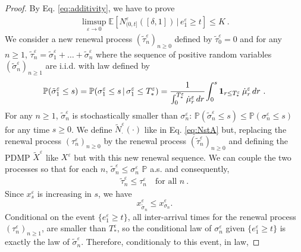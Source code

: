 \documentclass[reqno, 12pt, a4paper]{amsart}
\theoremstyle{plain}
\theoremstyle{definition}
\begin{document}
\begin{proof}
By Eq. \eqref{eq:additivity}, we have to prove 
\begin{equation}
\begin{split}
\limsup_{\varepsilon \to 0} \mathbb E \left[ N^\varepsilon_{(0,t]} ([\delta,1])  \, \vert \, e_1^\varepsilon \ge t \right] \le K \ .
\end{split}
\end{equation}
We consider a new renewal process $(\tilde\tau_n^\varepsilon)_{n \ge 0}$ defined by $\tilde\tau_0^\varepsilon=0$ and for any $n \ge 1$, $\tilde\tau_n^\varepsilon = \tilde\sigma_1^\varepsilon + \ldots+\tilde\sigma_n^\varepsilon$ where the sequence of positive random variables $(\tilde\sigma_n^\varepsilon)_{n \ge 1}$ are i.i.d. with law defined by 
\begin{equation}
\begin{split}
\mathbb P (\tilde\sigma^\varepsilon_1 \le s) = \mathbb P( \sigma_1^\varepsilon \le s  \, \vert \, \sigma_1^\varepsilon \le T_*^\varepsilon) = \cfrac{1}{\int_0^{T_*^\varepsilon}  \dot{\mu}_r^\varepsilon \, dr } \int_0^s {\bf 1}_{r \le T^\varepsilon_*}  \, \dot{\mu}_r^\varepsilon \, dr \ .
\end{split}
\end{equation}
For any $n \ge 1$, $\tilde\sigma_n^\varepsilon$ is stochastically smaller than $\sigma_n^\varepsilon$: $\mathbb P (\tilde\sigma_n^\varepsilon \le s) \le \mathbb P (\sigma_n^\varepsilon \le s)$ for any time $s \ge 0$. We define ${\tilde N}_{\cdot}^\varepsilon (\cdot)$ like in Eq. \eqref{eq:NstA} but,  replacing the renewal process $(\tau_n^\varepsilon)_{n\ge 0}$ by the renewal process $(\tilde\tau_n^\varepsilon)_{n \ge 0}$ and defining the PDMP $\tilde X^\varepsilon$ like $X^\varepsilon$ but with this new renewal sequence. We can couple the two processes so that for each $n$, $\tilde\sigma_n^\varepsilon \leq \sigma_n^\varepsilon $ $\mathbb P$ a.s. and consequently,
\begin{equation}
\label{eq:tau-tildetau}
\begin{split}
\tilde{\tau}^\varepsilon_n \leq \tau^\varepsilon_n \quad \text{for all } n \ .
\end{split}
\end{equation}
Since $x_s^\varepsilon$ is increasing in $s$, we have
\[
x_{\tilde\sigma_n}^\varepsilon \leq x_{\sigma_n}^\varepsilon.
\]
Conditional on the event $\{e_1^\varepsilon \geq t\}$, all inter-arrival times for the renewal process $(\tau_n^\varepsilon)_{n \ge 1}$, are smaller than $T_*^\varepsilon$, so the conditional law of $\sigma_n^\varepsilon$ given $\{e_1^\varepsilon \geq t\}$ is exactly the law of $\tilde\sigma_n^\varepsilon$. Therefore, conditionaly to this event, in law,

\end{proof}
\end{document}
